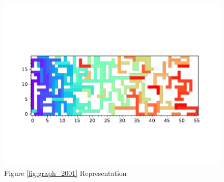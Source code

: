 \documentclass{standalone}
\begin{document}
\begin{figure}[!htb]
	\caption{Figure \ref{fig:graph_2001} Representation}
	\label{fig:picture_2001}
	\includegraphics[width=\textwidth]{../graphs/picture/2001.pdf}
\end{figure}
\end{document}
